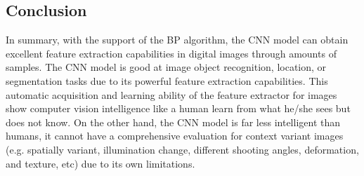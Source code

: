 \documentclass[10pt, a4paper]{article}
\begin{document}
\begin{multicols}{2}
	\section{Conclusion} \justify
	In summary, with the support of the BP algorithm, the CNN model can obtain excellent feature extraction capabilities in digital images through amounts of samples. The CNN model is good at image object recognition, location, or segmentation tasks due to its powerful feature extraction capabilities. This automatic acquisition and learning ability of the feature extractor for images show computer vision intelligence like a human learn from what he/she sees but does not know. On the other hand, the CNN model is far less intelligent than humans, it cannot have a comprehensive evaluation for context variant images (e.g. spatially variant, illumination change, different shooting angles, deformation, and texture, etc) due to its own limitations. 


	
	  

	\end{multicols}
\end{document}

